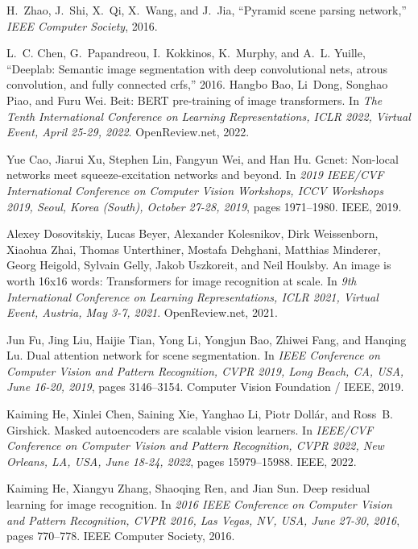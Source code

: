 \documentclass[11pt]{article}
\begin{document}
\begin{thebibliography}{99}
H.~Zhao, J.~Shi, X.~Qi, X.~Wang, and J.~Jia, ``Pyramid scene parsing network,''
  \emph{IEEE Computer Society}, 2016.

L.~C. Chen, G.~Papandreou, I.~Kokkinos, K.~Murphy, and A.~L. Yuille, ``Deeplab:
  Semantic image segmentation with deep convolutional nets, atrous convolution,
  and fully connected crfs,'' 2016.
Hangbo Bao, Li~Dong, Songhao Piao, and Furu Wei.
\newblock Beit: {BERT} pre-training of image transformers.
\newblock In {\em The Tenth International Conference on Learning
  Representations, {ICLR} 2022, Virtual Event, April 25-29, 2022}.
  OpenReview.net, 2022.

Yue Cao, Jiarui Xu, Stephen Lin, Fangyun Wei, and Han Hu.
\newblock Gcnet: Non-local networks meet squeeze-excitation networks and
  beyond.
\newblock In {\em 2019 {IEEE/CVF} International Conference on Computer Vision
  Workshops, {ICCV} Workshops 2019, Seoul, Korea (South), October 27-28, 2019},
  pages 1971--1980. {IEEE}, 2019.

Alexey Dosovitskiy, Lucas Beyer, Alexander Kolesnikov, Dirk Weissenborn,
  Xiaohua Zhai, Thomas Unterthiner, Mostafa Dehghani, Matthias Minderer, Georg
  Heigold, Sylvain Gelly, Jakob Uszkoreit, and Neil Houlsby.
\newblock An image is worth 16x16 words: Transformers for image recognition at
  scale.
\newblock In {\em 9th International Conference on Learning Representations,
  {ICLR} 2021, Virtual Event, Austria, May 3-7, 2021}. OpenReview.net, 2021.

Jun Fu, Jing Liu, Haijie Tian, Yong Li, Yongjun Bao, Zhiwei Fang, and Hanqing
  Lu.
\newblock Dual attention network for scene segmentation.
\newblock In {\em {IEEE} Conference on Computer Vision and Pattern Recognition,
  {CVPR} 2019, Long Beach, CA, USA, June 16-20, 2019}, pages 3146--3154.
  Computer Vision Foundation / {IEEE}, 2019.

Kaiming He, Xinlei Chen, Saining Xie, Yanghao Li, Piotr Doll{\'{a}}r, and
  Ross~B. Girshick.
\newblock Masked autoencoders are scalable vision learners.
\newblock In {\em {IEEE/CVF} Conference on Computer Vision and Pattern
  Recognition, {CVPR} 2022, New Orleans, LA, USA, June 18-24, 2022}, pages
  15979--15988. {IEEE}, 2022.

Kaiming He, Xiangyu Zhang, Shaoqing Ren, and Jian Sun.
\newblock Deep residual learning for image recognition.
\newblock In {\em 2016 {IEEE} Conference on Computer Vision and Pattern
  Recognition, {CVPR} 2016, Las Vegas, NV, USA, June 27-30, 2016}, pages
  770--778. {IEEE} Computer Society, 2016.


\end{thebibliography}
\end{document}
